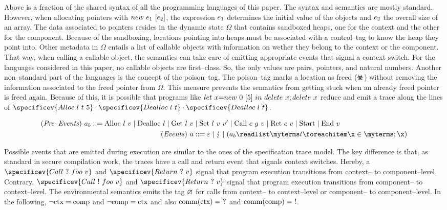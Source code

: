\documentclass[utf8,acmsmall,review,screen,dvipsnames]{acmart}
\begin{document}
Above is a fraction of the shared syntax of all the programming languages of this paper.
The syntax and semantics are mostly standard.
However, when allocating pointers with $\lnew{\expr[_{1}]}{\expr[_{2}]}$, the expression $\expr[_{1}]$ determines the initial value of the objects and $\expr[_{2}]$ the overall size of an array.
The data associated to pointers resides in the dynamic state $\Omega$ that contains sandboxed heaps, one for the context and the other for the component.
Because of the sandboxing, locations pointing into heaps must be associated with a control--tag to know the heap they point into.
Other metadata in $\Omega$ entails a list of callable objects with information on wether they belong to the context or the component.
That way, when calling a callable object, the semantics can take care of emitting appropriate events that signal a context switch.
For the languages considered in this paper, no callable objects are first--class.
So, the only values are pairs, pointers, and natural numbers.
Another non--standard part of the languages is the concept of the poison--tag.
The poison--tag marks a location as freed ($\poisoned$) without removing the information associated to the freed pointer from $\Omega$.
This measure prevents the semantics from getting stuck when an already freed pointer is freed again.
Because of this, it is possible that programs like $\llet{x}{\lnew{0}{5}}{\ldelete{x};\ldelete{x}}$ reduce and emit a trace along the lines of $\specificev{Alloc\ \loc\ \sandboxtag\ 5}\cdot\specificev{Dealloc\ \loc\ \sandboxtag}\cdot\specificev{Dealloc\ \loc\ \sandboxtag}$.

\begin{gather*}
  \begin{aligned}
  \mi{(Pre\text{--}Events)}~\event[_{b}]\bnfdef \ev{Alloc}\ \loc\ \valueexpr \mid \ev{Dealloc}\ \loc \mid \ev{Get}\ \loc\ \valueexpr &\mid \ev{Set}\ \loc\ \valueexpr\ \valueexpr['] \mid \ev{Call}\ \comm\ g\ \valueexpr \mid \ev{Ret}\ \comm\ \valueexpr \mid \ev{Start} \mid \ev{End}\ \valueexpr \\
  \mi{(Events)}~\event&\bnfdef \emptyevent \mid \lightning \mid \tup{\event[_{b}]}{\sandboxtag} \\
  \end{aligned}
\end{gather*}

Possible events that are emitted during execution are similar to the ones of the specification trace model.
The key difference is that, as standard in secure compilation work, the traces have a call and return event that signals context switches.
Hereby, a $\specificev{Call\ \ctxtocomp\ foo\ \valueexpr}$ and $\specificev{Return\ \ctxtocomp\ \valueexpr}$ signal that program execution transitions from context-- to component--level.
Contrary, $\specificev{Call\ \comptoctx\ foo\ \valueexpr}$ and $\specificev{Return\ \ctxtocomp\ \valueexpr}$ signal that program execution transitions from component-- to context--level.
The environmental semantics emits the tag $\nocomm$ for calls from context-- to context--level or component-- to component--level.
In the following, $\neg\ctx=\comp$ and $\neg\comp=\ctx$ and also $\operatorname{comm}(\ctx)=\ \ctxtocomp$ and $\operatorname{comm}(\comp)=\ \comptoctx$.
\end{document}
